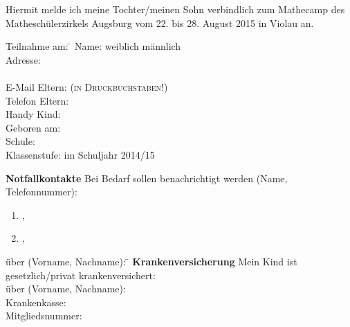\documentclass[13pt]{zettel}
\begin{document}
\renewcommand{\betreff}{Anmeldung zum Mathecamp des Matheschülerzirkels Augsburg}


Hiermit melde ich meine Tochter/meinen Sohn verbindlich zum Mathecamp des
Matheschülerzirkels Augsburg vom 22. bis 28. August 2015 in
Violau an.

\vspace{-1.0em}
\doublespacing
\begin{tabbing}
  Teilnahme am: \= \kill
  Name: \> \freistLang \checkbox weiblich \checkbox männlich \\
  Adresse: \> \freistLang \\
  \> \freistLang \\
  E-Mail Eltern: \> \freistLang{} \textsc{(in Druckbuchstaben!)} \\
  Telefon Eltern: \> \freistLang \\
  Handy Kind: \> \freistLang \\
  Geboren am: \> \freistLang \\
  Schule: \> \freistLang \\
  Klassenstufe: \> \freistKurz{} im Schuljahr 2014/15
\end{tabbing}

\vspace{-0.8cm}
\begin{shaded}
\textbf{Notfallkontakte} Bei Bedarf sollen benachrichtigt werden (Name, Telefonnummer):
\begin{enumerate}
\item \freist{7cm},\quad\freist{7cm}
\item \freist{7cm},\quad\freist{7cm}
\end{enumerate}
\end{shaded}

\enlargethispage{2cm}
\vspace{-1.0cm}
\begin{shaded}
\vspace{-2.2em}
\begin{tabbing}
über (Vorname, Nachname): \= \kill
\textbf{Krankenversicherung} Mein Kind ist gesetzlich/privat krankenversichert: \\
über (Vorname, Nachname): \> \freistLang \\
Krankenkasse: \> \freistLang \\
Mitgliedsnummer: \> \freistLang
\end{tabbing}
\vspace{-1.5em}
\end{shaded}
\end{document}
